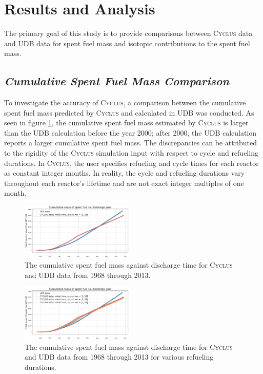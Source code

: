 \documentclass{anstrans}
\newcommand{\Cyclus}{\textsc{Cyclus}\xspace}%
\begin{document}
\section{Results and Analysis}
The primary goal of this study is to provide comparisons between 
\Cyclus data and \gls{UDB} data for spent fuel mass and isotopic contributions to the 
spent fuel mass. 

\subsection{\textit{Cumulative Spent Fuel Mass Comparison}}
To investigate the accuracy of \Cyclus, a comparison between the cumulative spent fuel mass 
predicted by \Cyclus and calculated in \gls{UDB} was conducted. As seen in figure \ref{fig:total_original}, the cumulative spent fuel mass estimated by \Cyclus is larger than the \gls{UDB} calculation before the year 2000; after 2000, the \gls{UDB} calculation reports a larger cumulative spent fuel mass. The discrepancies can be attributed to the rigidity of the \Cyclus simulation input with respect to cycle and 
refueling durations. In \Cyclus, the user specifies refueling and cycle times for each 
reactor as constant integer months.  In reality, the cycle and refueling durations 
vary throughout each reactor's lifetime and are not exact integer multiples of one month. 

\begin{figure}[t] %
	\centering
	\includegraphics[width=0.48\textwidth]{../figures/cumulative_mass_udb_cyclus}
	\caption{The cumulative spent fuel mass against discharge time for \Cyclus and \gls{UDB} data from 1968 through 2013.}
	\label{fig:total_original}
\end{figure}

\begin{figure}[t] 
	\centering
	\includegraphics[width=0.48\textwidth]{../figures/cumulative_mass_udb_cyclus_refueltime}
	\caption{The cumulative spent fuel mass against discharge time for \Cyclus and \gls{UDB} data from 1968 through 2013 for various refueling durations.}
	\label{fig:total_refueltime}
\end{figure} 
\end{document}
